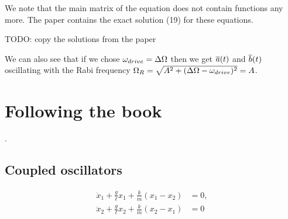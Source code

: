 We note that the main matrix of the equation does not contain functions any more. The paper contains
the exact solution (19) for these equations.

\vsp
TODO: copy the solutions from the paper
\vsp

We can also see that if we chose $\omega_{drive} = \Delta\Omega$ then we get $\overline{a}(t)$ and $\overline{b}(t)$ oscillating with the Rabi
frequency $\Omega_R = \sqrt{A^2 + (\Delta\Omega - \omega_{drive})^2} = A$.




\section{Following the book}
.

\subsection{Coupled oscillators}

\[
\begin{aligned}
  \ddot{x}_1 + \frac{g}{\ell} x_1 + \frac{k}{m} (x_1 - x_2) &= 0, \\
  \ddot{x}_2 + \frac{g}{\ell} x_2 + \frac{k}{m} (x_2 - x_1) &= 0
\end{aligned}
\]



